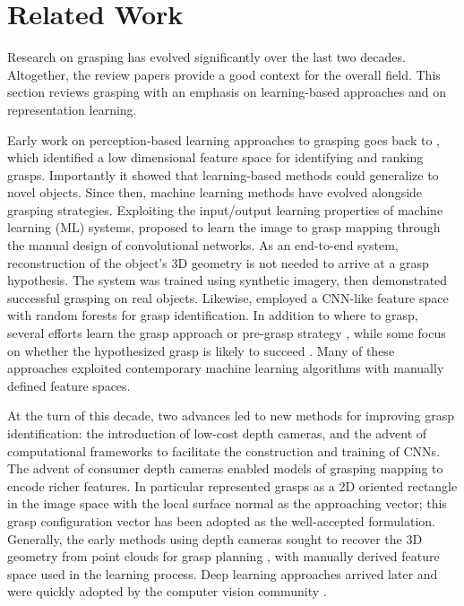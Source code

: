 \documentclass[letterpaper, 10 pt, journal, twoside]{IEEEtran}
\begin{document}
 
\section{Related Work}
Research on grasping has evolved significantly over the last two
decades.  Altogether, the review papers 
\cite{shimoga1996robot,bicchi2000robotic,sahbani2012overview,bohg2014data} 
provide a good context for the overall field.  This section reviews
grasping with an emphasis on learning-based approaches and on
representation learning.



Early work on perception-based learning approaches to grasping goes back
to \cite{kamon1996learning}, which identified a low dimensional feature
space for identifying and ranking grasps. Importantly it showed that
learning-based methods could generalize to novel objects.  Since then,
machine learning methods have evolved alongside grasping strategies.
Exploiting the input/output learning properties of machine learning (ML)
systems, \cite{saxena2008robotic} proposed to learn the image to grasp
mapping through the manual design of convolutional
networks. As an end-to-end system, reconstruction of the object's 3D
geometry is not needed to arrive at a grasp hypothesis.  The system was
trained using synthetic imagery, then demonstrated successful grasping
on real objects.  Likewise, \cite{asif2017rgb} employed a CNN-like
feature space with random forests for grasp identification.
In addition to where to grasp,
several efforts learn the grasp approach or pre-grasp strategy
\cite{ekvall2007learning,huebner2008selection}, while some focus on whether the
hypothesized grasp is likely to succeed \cite{le2010learning}.  Many of
these approaches exploited contemporary machine learning algorithms with
manually defined feature spaces.

At the turn of this decade, two advances led to new methods for
improving grasp identification: the introduction of low-cost depth
cameras, and the advent of computational frameworks to facilitate the
construction and training of CNNs.
The advent of consumer depth cameras enabled models of grasping mapping
to encode richer features.
In particular \cite{jiang2011efficient} represented grasps as a 2D
oriented rectangle in the image space with the local surface normal as
the approaching vector; this grasp configuration vector has been adopted
as the well-accepted formulation.  
Generally, the early methods using depth cameras sought to recover the
3D geometry from point clouds for grasp planning \cite{rao2010grasping},
with manually derived feature space used in the learning process. Deep
learning approaches arrived later \cite{krizhevsky2012imagenet} and were 
quickly adopted by the computer vision community \cite{he2016deep}.
\end{document}
